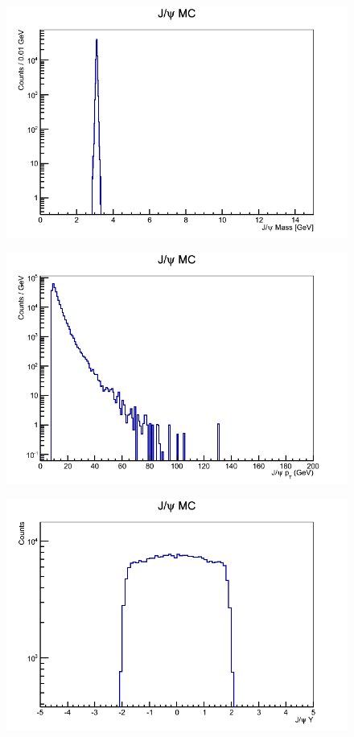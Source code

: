 \documentclass[a4paper,12pt]{article}
\begin{document}
\begin{figure}[]
    \centering
      \includegraphics[scale=0.5]{Images/jpsi_mass.png}
    \caption{}
\end{figure}
\begin{figure}[]
    \centering
      \includegraphics[scale=0.5]{Images/jpsi_pt.png}
    \caption{}
\end{figure}
\begin{figure}[]
    \centering
      \includegraphics[scale=0.5]{Images/jpsi_rap.png}
    \caption{}
\end{figure}
\end{document}

